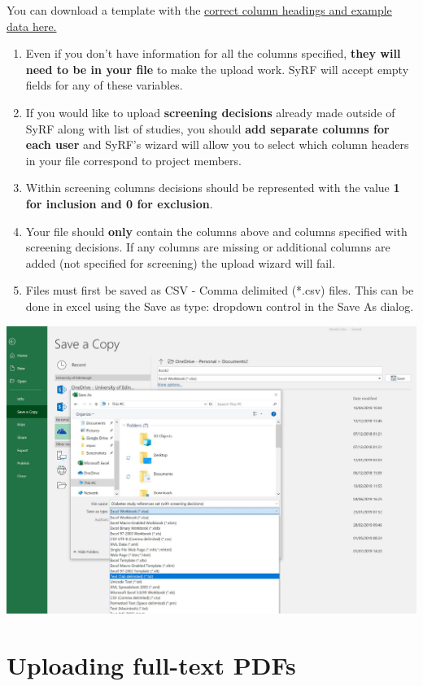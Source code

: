 \documentclass[
]{book}
\providecommand{\tightlist}{%
  \setlength{\itemsep}{0pt}\setlength{\parskip}{0pt}}
\begin{document}
You can download a template with the \href{https://syrf.org.uk/assets/pdfs/Systematic_search_instructions.html}{correct column headings and example data here.}

\begin{enumerate}
\def\labelenumi{\arabic{enumi}.}
\setcounter{enumi}{2}
\tightlist
\item
  Even if you don't have information for all the columns specified, \textbf{they will need to be in your file} to make the upload work. SyRF will accept empty fields for any of these variables.
\item
  If you would like to upload \textbf{screening decisions} already made outside of SyRF along with list of studies, you should \textbf{add separate columns for each user} and SyRF's wizard will allow you to select which column headers in your file correspond to project members.
\item
  Within screening columns decisions should be represented with the value \textbf{1 for inclusion and 0 for exclusion}.
\item
  Your file should \textbf{only} contain the columns above and columns specified with screening decisions. If any columns are missing or additional columns are added (not specified for screening) the upload wizard will fail.
\item
  Files must first be saved as CSV - Comma delimited (*.csv) files. This can be done in excel using the Save as type: dropdown control in the Save As dialog.
\end{enumerate}

\includegraphics[width=32.71in]{figs/save_csv}

\hypertarget{uploading-full-text-pdfs}{%
\section{Uploading full-text PDFs}\label{uploading-full-text-pdfs}}
\end{document}
